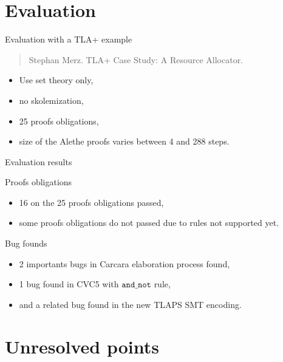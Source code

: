 \documentclass[aspectratio=169,xcolor={dvipsnames}]{beamer}
\begin{document}
\section{Evaluation}

\AtBeginSection[]
{
  \begin{frame}
    \tableofcontents[currentsection]
  \end{frame}
}

\begin{frame}{Evaluation with a TLA+ example}
\begin{quote}
Stephan Merz. TLA+ Case Study: A Resource Allocator.
\end{quote}
\begin{itemize}
    \item Use set theory only,
    \item no skolemization,
    \item 25 proofs obligations,
    \item size of the Alethe proofs varies between 4 and 288 steps.
\end{itemize}
\end{frame}

\begin{frame}{Evaluation results}
\begin{block}{Proofs obligations}
\begin{itemize}
    \item 16 on the 25 proofs obligations passed,
    \item some proofs obligations do not passed due to rules not supported yet.
\end{itemize}
\end{block}
\begin{block}{Bug founds}
\begin{itemize}
\item 2 importants bugs in Carcara elaboration process found,
\item 1 bug found in CVC5 with $\texttt{and\_not}$ rule,
\item and a related bug found in the new TLAPS SMT encoding.
\end{itemize}
\end{block}
\end{frame}

\section{Unresolved points}

\AtBeginSection[]
{
  \begin{frame}
    \tableofcontents[currentsection]
  \end{frame}
}
\end{document}
